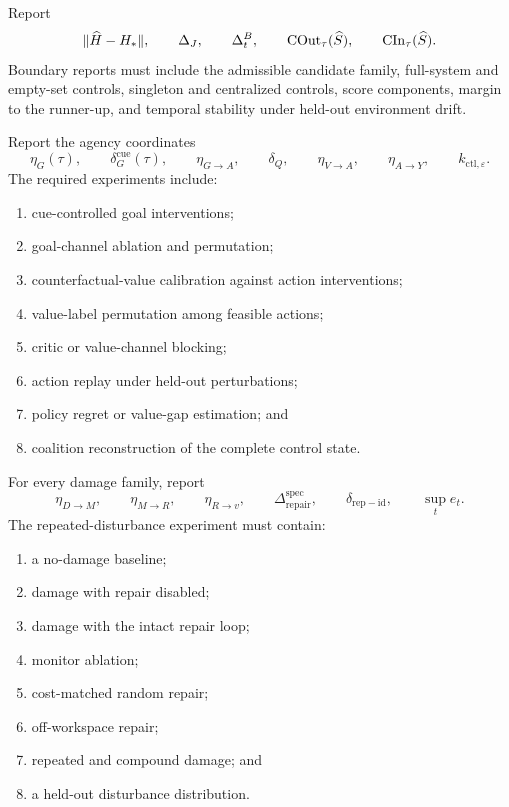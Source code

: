 
Report
\[
\|\widehat H-H_*\|,
\qquad
\Delta_J,
\qquad
\Delta_t^B,
\qquad
\operatorname{COut}_\tau(\widehat S),
\qquad
\operatorname{CIn}_\tau(\widehat S).
\]
Boundary reports must include the admissible candidate family, full-system and
empty-set controls, singleton and centralized controls, score components,
margin to the runner-up, and temporal stability under held-out environment
drift.


Report the agency coordinates
\[
\eta_G(\tau),
\qquad
\delta_G^{\mathrm{cue}}(\tau),
\qquad
\eta_{G\to A},
\qquad
\delta_Q,
\qquad
\eta_{V\to A},
\qquad
\eta_{A\to Y},
\qquad
 k_{\mathrm{ctl},\varepsilon}.
\]
The required experiments include:
\begin{enumerate}
\item cue-controlled goal interventions;
\item goal-channel ablation and permutation;
\item counterfactual-value calibration against action interventions;
\item value-label permutation among feasible actions;
\item critic or value-channel blocking;
\item action replay under held-out perturbations;
\item policy regret or value-gap estimation; and
\item coalition reconstruction of the complete control state.
\end{enumerate}


For every damage family, report
\[
\eta_{D\to M},
\qquad
\eta_{M\to R},
\qquad
\eta_{R\to v},
\qquad
\Delta_{\mathrm{repair}}^{\mathrm{spec}},
\qquad
\delta_{\mathrm{rep-id}},
\qquad
\sup_t e_t.
\]
The repeated-disturbance experiment must contain:
\begin{enumerate}
\item a no-damage baseline;
\item damage with repair disabled;
\item damage with the intact repair loop;
\item monitor ablation;
\item cost-matched random repair;
\item off-workspace repair;
\item repeated and compound damage; and
\item a held-out disturbance distribution.
\end{enumerate}

